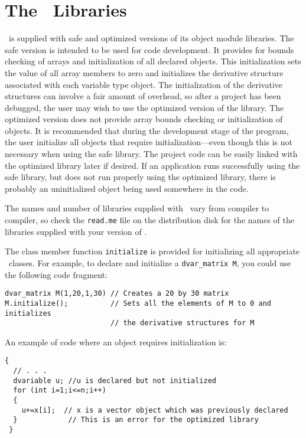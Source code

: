 \documentclass{admbmanual}
\begin{document}

\chapter{The \scAD\ Libraries}

\scAD\ is supplied with safe and optimized versions
 of its object module libraries.
The safe version is intended to be used for code development.
It provides for bounds checking of arrays and initialization
of all declared objects. This initialization sets the
value of all array members to zero and initializes the derivative
structure associated with each variable type object.
The initialization of the derivative structures can
involve a fair amount of overhead, so after a project
has been debugged, the user may wish to use the optimized version
of the library. The optimized version does not provide array
bounds checking or initialization of objects. 
It is recommended that during
the development stage of the program, the user initialize all objects that require
initialization---even though this is not
necessary when using the safe library. The project code can
be easily linked with the optimized library later if desired.
If an application runs successfully using the safe library, but does
not run properly using the optimized library, there is probably
an uninitialized object being used somewhere in the code. 

The names and number of libraries supplied with \scAD\ vary from
compiler to compiler, so check the \texttt{read.me} file on
the distribution disk for the names of the libraries supplied with
your version of \scAD.

The class member function \texttt{initialize} is provided for initializing all
appropriate \scAD\ classes. For example, to declare and 
initialize a \texttt{dvar\_matrix M}, you could use the following code fragment:
\begin{lstlisting}
dvar_matrix M(1,20,1,30) // Creates a 20 by 30 matrix
M.initialize();          // Sets all the elements of M to 0 and initializes
                         // the derivative structures for M
\end{lstlisting}

An example of code where an object requires initialization is: 
\begin{lstlisting}
{
  // . . .
  dvariable u; //u is declared but not initialized
  for (int i=1;i<=n;i++)
  {
    u+=x[i];  // x is a vector object which was previously declared
  }            // This is an error for the optimized library
 }
\end{lstlisting}
\end{document}

